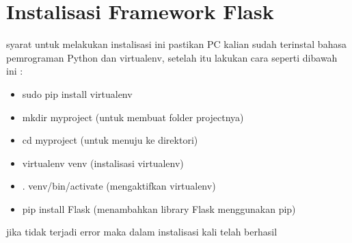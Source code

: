 \section{Instalisasi Framework Flask}
syarat untuk melakukan instalisasi ini pastikan PC kalian sudah terinstal bahasa pemrograman Python dan virtualenv, setelah
itu lakukan cara seperti dibawah ini :
\begin{itemize}
\item sudo pip install virtualenv 
\item mkdir myproject (untuk membuat folder projectnya)
\item cd myproject (untuk menuju ke direktori)
\item virtualenv venv (instalisasi virtualenv)
\item . venv/bin/activate (mengaktifkan virtualenv)
\item pip install Flask (menambahkan library Flask menggunakan pip)
\end{itemize}
jika tidak terjadi error maka dalam instalisasi kali telah berhasil



